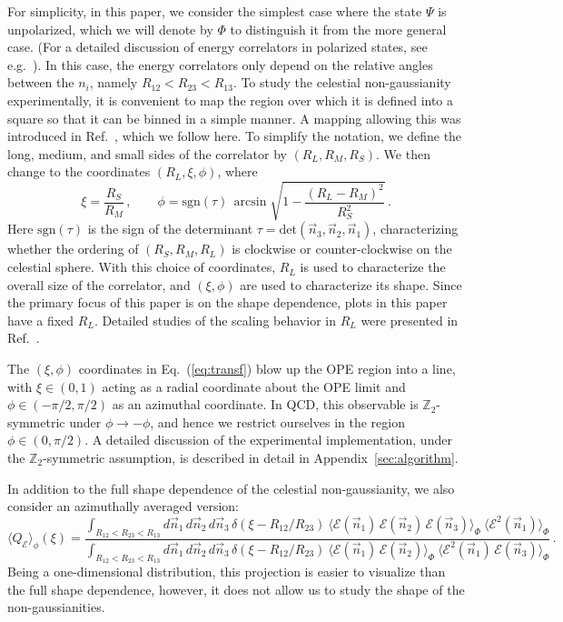 \documentclass[letterpaper,11pt]{article}
\def\App#1{Appendix~\ref{#1}}
\def\to{\rightarrow}
\DeclareRobustCommand{\App}[1]{App.~\ref{#1}}
\DeclareRobustCommand{\Eq}[1]{Eq.~(\ref{#1})}
\DeclareRobustCommand{\Ref}[1]{Ref.~\cite{#1}}
\def\cE{\mathcal{E}}
\def\cE{\mathcal{E}}
\begin{document}
For simplicity, in this paper, we consider the simplest case where the state $\Psi$ is unpolarized, which we will denote by $\Phi$ to distinguish it from the more general case.
%
(For a detailed discussion of energy correlators in polarized states, see e.g.~\cite{Chang:2020qpj}).
%
In this case, the energy correlators only depend on the relative angles between the $n_i$, namely $R_{12} < R_{23} < R_{13}$.
%
To study the celestial non-gaussianity experimentally, it is convenient to map the region over which it is defined into a square so that it can be binned in a simple manner.
%
A mapping allowing this was introduced in \Ref{Komiske:2022enw}, which we follow here.
%
To simplify the notation, we define the  long, medium, and small sides of the correlator by $(R_L, R_M, R_S)$.
We then change to the coordinates $(R_L, \xi, \phi)$, where 
\begin{equation}
\xi=\frac{R_S}{R_M} \,, \qquad \phi=\mathrm{sgn} (\tau) \, \arcsin \sqrt{1 - \frac{(R_L-R_M)^2}{R_S^2}}\,.
\label{eq:transf}
\end{equation}
%
Here $\mathrm{sgn}(\tau)$ is the sign of the determinant $\tau = \mathrm{det}(\vec{n}_3, \vec{n}_2, \vec{n}_1)$, characterizing whether the ordering of $(R_S, R_M, R_L)$ is  clockwise or counter-clockwise on the celestial sphere. With this choice of coordinates, $R_L$ is used to characterize the overall size of the correlator, and $(\xi, \phi)$ are used to characterize its shape. Since the primary focus of this paper is on the shape dependence, plots in this paper have a fixed $R_L$. Detailed studies of the scaling behavior in $R_L$ were presented in \Ref{Komiske:2022enw}.


The $(\xi, \phi)$ coordinates in \Eq{eq:transf} blow up the OPE region into a line, with $\xi \in (0,1)$ acting as a radial coordinate about the OPE limit and $\phi \in (-\pi/2, \pi/2)$ as an azimuthal coordinate.
%
In QCD, this observable is $\mathbb{Z}_2$-symmetric under $\phi \to -\phi$, and hence we restrict ourselves in the region $\phi \in (0, \pi/2)$.
%
%
A detailed discussion of the experimental implementation, under the $\mathbb{Z}_2$-symmetric assumption, is described in detail in \App{sec:algorithm}.


In addition to the full shape dependence of the celestial non-gaussianity, we also consider an azimuthally averaged version:
%
\begin{equation}
\langle Q_\cE \rangle_\phi (\xi) =\frac{
\int_{R_{12}<R_{23}<R_{13}} d\vec{n}_1 \, d\vec{n}_2 \, d\vec{n}_3 \, \delta(\xi - R_{12}/R_{23}) ~ \langle\mathcal{E}(\vec{n}_1)\, \mathcal{E}(\vec{n}_2)\, \mathcal{E}(\vec{n}_3)\rangle_\Phi ~ \langle\mathcal{E}^2(\vec{n}_1)\rangle_\Phi}
{\int_{R_{12}<R_{23}<R_{13}} d\vec{n}_1 \, d\vec{n}_2 \, d\vec{n}_3 \, \delta(\xi - R_{12}/R_{23}) ~ \langle\mathcal{E}(\vec{n}_1)\, \mathcal{E}(\vec{n}_2)\rangle_\Phi ~ \langle\mathcal{E}^2(\vec{n}_1)\, \mathcal{E}(\vec{n}_3)\rangle_\Phi}\,.
\label{eq:azimuthal_average}
\end{equation}
%
Being a one-dimensional distribution, this projection is easier to visualize than the full shape dependence, however, it does not allow us to study the shape of the non-gaussianities.
\end{document}
